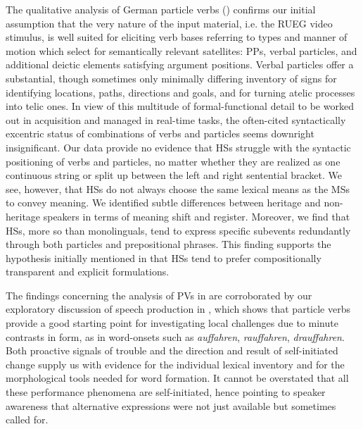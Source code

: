 \documentclass[output=paper,colorlinks,citecolor=brown]{langscibook}
\begin{document}
The qualitative analysis of German particle verbs () confirms our initial assumption that the very nature of the input material, i.e. the RUEG video stimulus, is well suited for eliciting verb bases referring to types and manner of motion which select for semantically relevant satellites: PPs, verbal particles, and additional deictic elements satisfying argument positions. Verbal particles offer a substantial, though sometimes only minimally differing inventory of signs for identifying locations, paths, directions and goals, and for turning atelic processes into telic ones. In view of this multitude of formal-functional detail to be worked out in acquisition and managed in real-time tasks, the often-cited syntactically excentric status of combinations of verbs and particles seems downright insignificant. Our data provide no evidence that HSs struggle with the syntactic positioning of verbs and particles, no matter whether they are realized as one continuous string or split up between the left and right sentential bracket. We see, however, that HSs do not always choose the same lexical means as the MSs to convey meaning. We identified subtle differences between heritage and non-heritage speakers in terms of meaning shift and register. Moreover, we find that HSs, more so than monolinguals, tend to express specific subevents redundantly through both particles and prepositional phrases. This finding supports the hypothesis initially mentioned in \citet[294--295]{Polinsky2018HeritageLanguages} that HSs tend to prefer compositionally transparent and explicit formulations.

The findings concerning the analysis of PVs in  are corroborated by our exploratory discussion of speech production in , which shows that particle verbs provide a good starting point for investigating local challenges due to minute contrasts in form, as in word-onsets such as \textit{auffahren}, \textit{rauffahren}, \textit{drauffahren}. Both proactive signals of trouble and the direction and result of self-initiated change supply us with evidence for the individual lexical inventory and for the morphological tools needed for word formation. It cannot be overstated that all these performance phenomena are self-initiated, hence pointing to speaker awareness that alternative expressions were not just available but sometimes called for.
\end{document}
